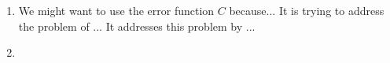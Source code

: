\documentclass[solution, letterpaper]{cs121}
\begin{document}
\problem{}

\begin{enumerate}
	\item We might want to use the error function $C$ because... It is trying to address the problem of ... It addresses this problem by ...
	\item
\end{enumerate}
\end{document}
